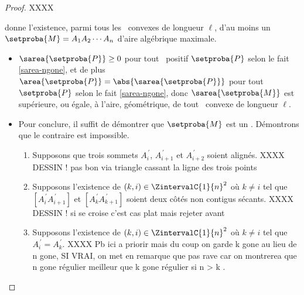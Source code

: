 \begin{proof}
	XXXX
	
	donne l'existence, parmi tous les \ncycles\ convexes de longueur $\ell$, d'au moins un \ncycle\ $\setproba{M} = A_1 A_2 \cdots A_n$ d'aire algébrique maximale.
	\begin{itemize}
        \item $\sarea{\setproba{P}} \geq 0$ pour tout \ngone\ positif $\setproba{P}$ selon le fait \ref{sarea-ngone}, 
        et de plus
        $\area{\setproba{P}} = \abs{\sarea{\setproba{P}}}$ pour tout \ngone\ $\setproba{P}$ selon le fait \ref{sarea-ngone},
        donc $\sarea{\setproba{M}}$ est supérieure, ou égale, à l'aire, géométrique, de tout \ngone\ convexe de longueur $\ell$.










        \item Pour conclure, il suffit de démontrer que $\setproba{M}$ est un \ngone. Démontrons que le contraire est impossible.
        \begin{enumerate}
        	\item Supposons que trois sommets $A^{\,\prime}_i$, $A^{\,\prime}_{i+1}$ et $A^{\,\prime}_{i+2}$ soient alignés.
			XXXX   DESSIN !
			pas bon via triangle cassant la ligne des trois points
			
			
        	\item Supposons l'existence de $(k, i) \in \ZintervalC{1}{n}^2$ où $k \neq i$ tel que $[A^{\,\prime}_i A^{\,\prime}_{i+1}]$ et $[A^{\,\prime}_k A^{\,\prime}_{k+1}]$ soient deux côtés non contigus sécants.
			XXXX   DESSIN !
			si se croise c'est cas plat mais rejeter avant


        	\item Supposons l'existence de $(k, i) \in \ZintervalC{1}{n}^2$ où $k \neq i$ tel que $A^{\,\prime}_i = A^{\,\prime}_k$.
			XXXX  Pb ici a priorir mais du coup on garde k gone au lieu de n gone, SI VRAI, on met en remarque que pas rave car on montrerea que n gone régulier meilleur que k gone régulier si n > k .
        \end{enumerate}
    \end{itemize}
	
	\null\vspace{-6ex}
\end{proof}













